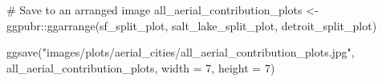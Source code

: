 \documentclass[
  letterpaper,
  DIV=11,
  numbers=noendperiod]{scrreprt}
\newenvironment{Shaded}{\begin{snugshade}}{\end{snugshade}}
\newcommand{\AttributeTok}[1]{\textcolor[rgb]{0.40,0.45,0.13}{#1}}
\newcommand{\CommentTok}[1]{\textcolor[rgb]{0.37,0.37,0.37}{#1}}
\newcommand{\DecValTok}[1]{\textcolor[rgb]{0.68,0.00,0.00}{#1}}
\newcommand{\FunctionTok}[1]{\textcolor[rgb]{0.28,0.35,0.67}{#1}}
\newcommand{\NormalTok}[1]{\textcolor[rgb]{0.00,0.23,0.31}{#1}}
\newcommand{\OtherTok}[1]{\textcolor[rgb]{0.00,0.23,0.31}{#1}}
\newcommand{\SpecialCharTok}[1]{\textcolor[rgb]{0.37,0.37,0.37}{#1}}
\newcommand{\StringTok}[1]{\textcolor[rgb]{0.13,0.47,0.30}{#1}}
\begin{document}
\begin{Shaded}
\begin{Highlighting}[]
\CommentTok{\# Save to an arranged image}
\NormalTok{all\_aerial\_contribution\_plots }\OtherTok{\textless{}{-}}\NormalTok{ ggpubr}\SpecialCharTok{::}\FunctionTok{ggarrange}\NormalTok{(sf\_split\_plot, }
\NormalTok{                                                   salt\_lake\_split\_plot, }
\NormalTok{                                                   detroit\_split\_plot)}

\FunctionTok{ggsave}\NormalTok{(}\StringTok{"images/plots/aerial\_cities/all\_aerial\_contribution\_plots.jpg"}\NormalTok{, }
\NormalTok{       all\_aerial\_contribution\_plots, }
       \AttributeTok{width =} \DecValTok{7}\NormalTok{, }
       \AttributeTok{height =} \DecValTok{7}\NormalTok{)}
\end{Highlighting}
\end{Shaded}
\end{document}
